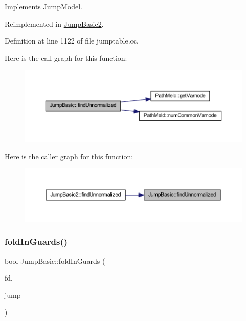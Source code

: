 Implements \mbox{\hyperlink{class_jump_model_aac83f52fbf3ee566e760dfabe6e67ee6}{Jump\+Model}}.



Reimplemented in \mbox{\hyperlink{class_jump_basic2_ab5d1cebab5d2f98d0caf6fc551b29980}{Jump\+Basic2}}.



Definition at line 1122 of file jumptable.\+cc.

Here is the call graph for this function\+:
\nopagebreak
\begin{figure}[H]
\begin{center}
\leavevmode
\includegraphics[width=350pt]{class_jump_basic_a2d542e5a6b74bd116d89ba4e5bb4da9b_cgraph}
\end{center}
\end{figure}
Here is the caller graph for this function\+:
\nopagebreak
\begin{figure}[H]
\begin{center}
\leavevmode
\includegraphics[width=350pt]{class_jump_basic_a2d542e5a6b74bd116d89ba4e5bb4da9b_icgraph}
\end{center}
\end{figure}
\mbox{\label{class_jump_basic_ae70d6baeeecb4b16e79de8516868ffe4}} 
\subsubsection{\texorpdfstring{foldInGuards()}{foldInGuards()}}
{\footnotesize\ttfamily bool Jump\+Basic\+::fold\+In\+Guards (\begin{DoxyParamCaption}\item[{\mbox{\hyperlink{class_funcdata}{Funcdata}} $\ast$}]{fd,  }\item[{\mbox{\hyperlink{class_jump_table}{Jump\+Table}} $\ast$}]{jump }\end{DoxyParamCaption})\hspace{0.3cm}{\ttfamily [virtual]}}



